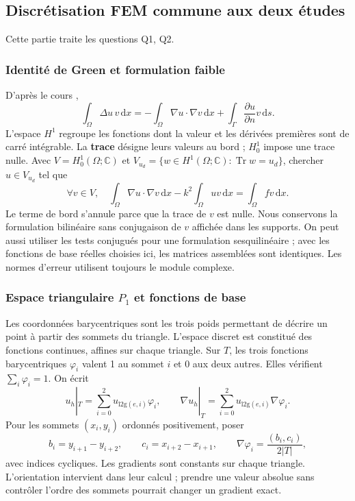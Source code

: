 \documentclass[12pt,a4paper]{article}
\newcommand{\dd}{\,\mathrm{d}}
\begin{document}
\subsection{Discrétisation FEM commune aux deux études}
Cette partie traite les questions Q1, Q2.

\subsubsection{Identité de Green et formulation faible}
D’après le cours \cite{fem},
\begin{equation*}
\int_\Omega\Delta u\,v\dd x=-\int_\Omega\nabla u\cdot\nabla v\dd x
+\int_\Gamma\frac{\partial u}{\partial n}v\dd s.
\end{equation*}
L'espace $H^1$ regroupe les fonctions dont la valeur et les dérivées premières sont de carré intégrable. La \textbf{trace} désigne leurs valeurs au bord ; $H^1_0$ impose une trace nulle. Avec $V=H^1_0(\Omega;\mathbb C)$ et $V_{u_d}=\{w\in H^1(\Omega;\mathbb C):\operatorname{Tr}w=u_d\}$, chercher $u\in V_{u_d}$ tel que
\begin{equation*}
\forall v\in V,\quad \int_\Omega\nabla u\cdot\nabla v\dd x
-k^2\int_\Omega uv\dd x=\int_\Omega fv\dd x.
\end{equation*}
Le terme de bord s'annule parce que la trace de $v$ est nulle. Nous conservons la formulation bilinéaire sans conjugaison de $v$ affichée dans les supports. On peut aussi utiliser les tests conjugués pour une formulation sesquilinéaire ; avec les fonctions de base réelles choisies ici, les matrices assemblées sont identiques. Les normes d'erreur utilisent toujours le module complexe.

\subsubsection{Espace triangulaire \texorpdfstring{$P_1$}{P1} et fonctions de base}
Les coordonnées barycentriques sont les trois poids permettant de décrire un point à partir des sommets du triangle.
L'espace discret est constitué des fonctions continues, affines sur chaque triangle. Sur $T$, les trois fonctions barycentriques $\varphi_i$ valent 1 au sommet $i$ et 0 aux deux autres. Elles vérifient $\sum_i\varphi_i=1$. On écrit
\begin{equation*}
u_h|_T=\sum_{i=0}^2u_{\mathrm{l2g}(e,i)}\varphi_i,\qquad
\nabla u_h|_T=\sum_{i=0}^2u_{\mathrm{l2g}(e,i)}\nabla\varphi_i.
\end{equation*}
Pour les sommets $(x_i,y_i)$ ordonnés positivement, poser
\begin{equation*}
b_i=y_{i+1}-y_{i+2},\qquad c_i=x_{i+2}-x_{i+1},\qquad
\nabla\varphi_i=\frac{(b_i,c_i)}{2|T|},
\end{equation*}
avec indices cycliques. Les gradients sont constants sur chaque triangle. L'orientation intervient dans leur calcul ; prendre une valeur absolue sans contrôler l'ordre des sommets pourrait changer un gradient exact.
\end{document}
